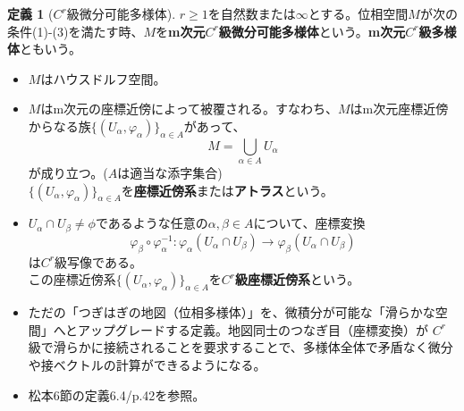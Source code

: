 \documentclass[paper=a4, fontsize=11pt]{jlreq} %
\theoremstyle{definition}
\newtheorem{definition}[theorem]{定義}
\begin{document}
\begin{definition}[$C^{r}$級微分可能多様体]
    $r\geq 1$を自然数または$\infty$とする。位相空間$M$が次の条件(1)-(3)を満たす時、$M$を\textbf{m次元$C^{r}$級微分可能多様体}という。\textbf{m次元$C^{r}$級多様体}ともいう。
    \begin{itemize}
        \item[(1)] $M$はハウスドルフ空間。
        \item[(2)] $M$はm次元の座標近傍によって被覆される。すなわち、$M$はm次元座標近傍からなる族$\{(U_{\alpha},\varphi_{\alpha})\}_{\alpha\in A}$があって、
                    \[
                    M = \bigcup_{\alpha\in A}U_{\alpha}
                    \]
                    が成り立つ。($A$は適当な添字集合)\\
                    $\{(U_{\alpha},\varphi_{\alpha})\}_{\alpha\in A}$を\textbf{座標近傍系}または\textbf{アトラス}という。
        \item[(3)] $U_{\alpha}\cap U_{\beta}\neq\phi$であるような任意の$\alpha,\beta\in A$について、座標変換
                    \[
                    \varphi_{\beta}\circ\varphi_{\alpha}^{-1}:\varphi_{\alpha}(U_{\alpha}\cap U_{\beta})\to\varphi_{\beta}(U_{\alpha}\cap U_{\beta})
                    \]
                    は$C^{r}$級写像である。\\
                    この座標近傍系$\{(U_{\alpha},\varphi_{\alpha})\}_{\alpha\in A}$を\textbf{$C^{r}$級座標近傍系}という。
    \end{itemize}
    \begin{itemize}
        \item[\textbf{Insight:}] ただの「つぎはぎの地図（位相多様体）」を、微積分が可能な「滑らかな空間」へとアップグレードする定義。地図同士のつなぎ目（座標変換）が $C^r$ 級で滑らかに接続されることを要求することで、多様体全体で矛盾なく微分や接ベクトルの計算ができるようになる。
        \item[\textbf{Link:}] 松本6節の定義6.4/p.42を参照。
    \end{itemize}
\end{definition}
\end{document}
